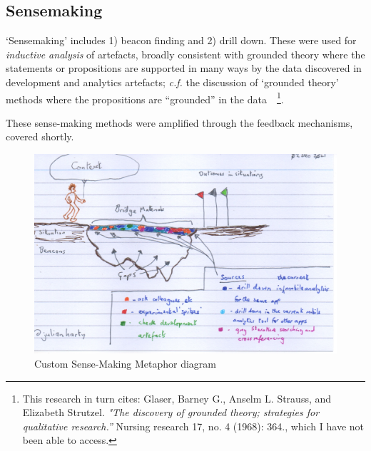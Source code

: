 \subsection{Sensemaking}

`Sensemaking' includes 1) beacon finding and 2) drill down. These were used for \textit{inductive analysis} of artefacts, broadly consistent with grounded theory where the statements or propositions are supported in many ways by the data discovered in development and analytics artefacts; \textit{c.f.} the discussion of `grounded theory' methods where the propositions are ``grounded'' in the data~\citep[p. 566]{seaman1999_qualitative_methods_in_esse}~\footnote{This research in turn cites:  Glaser, Barney G., Anselm L. Strauss, and Elizabeth Strutzel. \emph{"The discovery of grounded theory; strategies for qualitative research.''} Nursing research 17, no. 4 (1968): 364., which I have not been able to access.}. 


These sense-making methods were amplified through the feedback mechanisms, covered shortly. 

\begin{figure}
    \centering
    \includegraphics[width=15cm]{images/rough-sketches/the-sense-making-metafor-revised.jpeg}
    \caption{Custom Sense-Making Metaphor diagram}
    \label{fig:the-sense-making-metafor-revised}
\end{figure}

